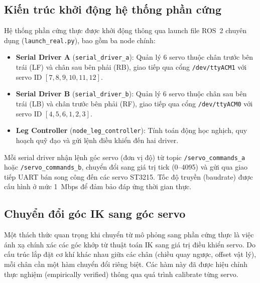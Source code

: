 \subsection{Kiến trúc khởi động hệ thống phần cứng}

Hệ thống phần cứng thực được khởi động thông qua launch file ROS~2 chuyên dụng (\texttt{launch\_real.py}), bao gồm ba node chính:

\begin{itemize}
    \item \textbf{Serial Driver A} (\texttt{serial\_driver\_a}): Quản lý 6 servo thuộc chân trước bên trái (LF) và chân sau bên phải (RB), giao tiếp qua cổng \texttt{/dev/ttyACM1} với servo ID $[7, 8, 9, 10, 11, 12]$.
    \item \textbf{Serial Driver B} (\texttt{serial\_driver\_b}): Quản lý 6 servo thuộc chân sau bên trái (LB) và chân trước bên phải (RF), giao tiếp qua cổng \texttt{/dev/ttyACM0} với servo ID $[4, 5, 6, 1, 2, 3]$.
    \item \textbf{Leg Controller} (\texttt{node\_leg\_controller}): Tính toán động học nghịch, quy hoạch quỹ đạo và gửi lệnh điều khiển đến hai driver.
\end{itemize}

Mỗi serial driver nhận lệnh góc servo (đơn vị độ) từ topic \texttt{/servo\_commands\_a} hoặc \texttt{/servo\_commands\_b}, chuyển đổi sang giá trị tick (0--4095) và gửi qua giao tiếp UART bán song công đến các servo ST3215. Tốc độ truyền (baudrate) được cấu hình ở mức 1~Mbps để đảm bảo đáp ứng thời gian thực.

\subsection{Chuyển đổi góc IK sang góc servo}

Một thách thức quan trọng khi chuyển từ mô phỏng sang phần cứng thực là việc ánh xạ chính xác các góc khớp từ thuật toán IK sang giá trị điều khiển servo. Do cấu trúc lắp đặt cơ khí khác nhau giữa các chân (chiều quay ngược, offset vật lý), mỗi chân cần một hàm chuyển đổi riêng biệt. Các hàm này đã được hiệu chỉnh thực nghiệm (empirically verified) thông qua quá trình calibrate từng servo.

